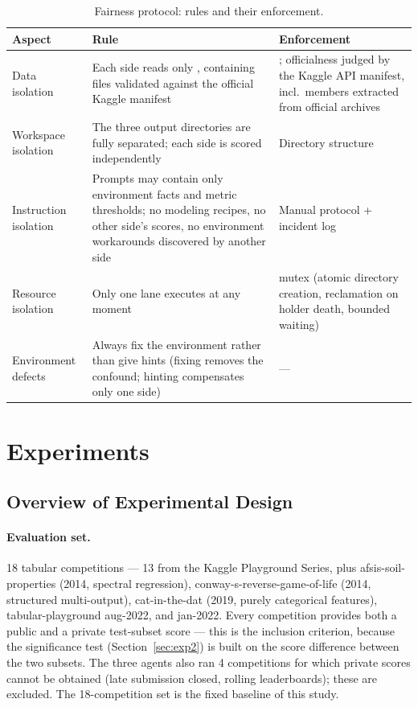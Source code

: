 \documentclass[11pt,a4paper]{article}
\begin{document}
\begin{table}[htbp]
\centering\small
\caption{Fairness protocol: rules and their enforcement.}
\label{tab:fairness}
\begin{tabular}{@{}L{2.4cm}L{6.6cm}L{5.6cm}@{}}
\toprule
\textbf{Aspect} & \textbf{Rule} & \textbf{Enforcement} \\
\midrule
Data isolation & Each side reads only , containing files validated against the official Kaggle manifest & ; officialness judged by the Kaggle API manifest, incl.\ members extracted from official archives \\
Workspace isolation & The three output directories are fully separated; each side is scored independently & Directory structure \\
Instruction isolation & Prompts may contain only environment facts and metric thresholds; no modeling recipes, no other side's scores, no environment workarounds discovered by another side & Manual protocol + incident log \\
Resource isolation & Only one lane executes at any moment &  mutex (atomic directory creation, reclamation on holder death, bounded waiting) \\
Environment defects & Always fix the environment rather than give hints (fixing removes the confound; hinting compensates only one side) & --- \\
\bottomrule
\end{tabular}
\end{table}

\section{Experiments}

\subsection{Overview of Experimental Design}

\paragraph{Evaluation set.} 18 tabular competitions --- 13 from the Kaggle Playground Series, plus afsis-soil-properties (2014, spectral regression), conway-s-reverse-game-of-life (2014, structured multi-output), cat-in-the-dat (2019, purely categorical features), tabular-playground aug-2022, and jan-2022. Every competition provides both a public and a private test-subset score --- this is the inclusion criterion, because the significance test (Section~\ref{sec:exp2}) is built on the score difference between the two subsets. The three agents also ran 4 competitions for which private scores cannot be obtained (late submission closed, rolling leaderboards); these are excluded. The 18-competition set is the fixed baseline of this study.
\end{document}
